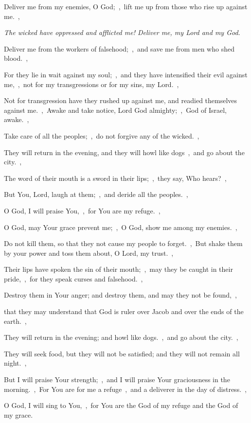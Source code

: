 \documentclass[12pt,twoside,a5paper]{article}
\newcommand{\qanona}[1]{{\liturgicalhint{Qanona.} \emph{#1}}}
\begin{document}
\begin{normalparskip}
  Deliver me from my enemies, O God;~\sep\ lift me up from those who rise up against me.~\sep

  \qanona{The wicked have oppressed and afflicted me! Deliver me, my Lord and my God.}

  Deliver me from the workers of falsehood;~\sep\ and save me from men who shed blood.~\sep

  For they lie in wait against my soul;~\sep\ and they have intensified their evil against me,~\sep\ not for my transgressions or for my sins, my Lord.~\sep

  Not for transgression have they rushed up against me, and readied themselves against me.~\sep\ Awake and take notice, Lord God almighty;~\sep\ God of Israel, awake.~\sep

  Take care of all the peoples;~\sep\ do not forgive any of the wicked.~\sep

  They will return in the evening, and they will howl like dogs~\sep\ and go about the city.~\sep

  The word of their mouth is a sword in their lips;~\sep\ they say, Who hears?~\sep

  But You, Lord, laugh at them;~\sep\ and deride all the peoples.~\sep

  O God, I will praise You,~\sep\ for You are my refuge.~\sep

  O God, may Your grace prevent me;~\sep\ O God, show me among my enemies.~\sep

  Do not kill them, so that they not cause my people to forget.~\sep\ But shake them by your power and toss them about, O Lord, my trust.~\sep

  Their lips have spoken the sin of their mouth;~\sep\ may they be caught in their pride,~\sep\ for they speak curses and falsehood.~\sep

  Destroy them in Your anger; and destroy them, and may they not be found,~\sep

  that they may understand that God is ruler over Jacob and over the ends of the earth.~\sep

  They will return in the evening; and howl like dogs.~\sep\ and go about the city.~\sep

  They will seek food, but they will not be satisfied; and they will not remain all night.~\sep

  But I will praise Your strength;~\sep\ and I will praise Your graciousness in the morning.~\sep\ For You are for me a refuge~\sep\ and a deliverer in the day of distress.~\sep

  O God, I will sing to You,~\sep\ for You are the God of my refuge and the God of my grace.
\end{normalparskip}
\end{document}
